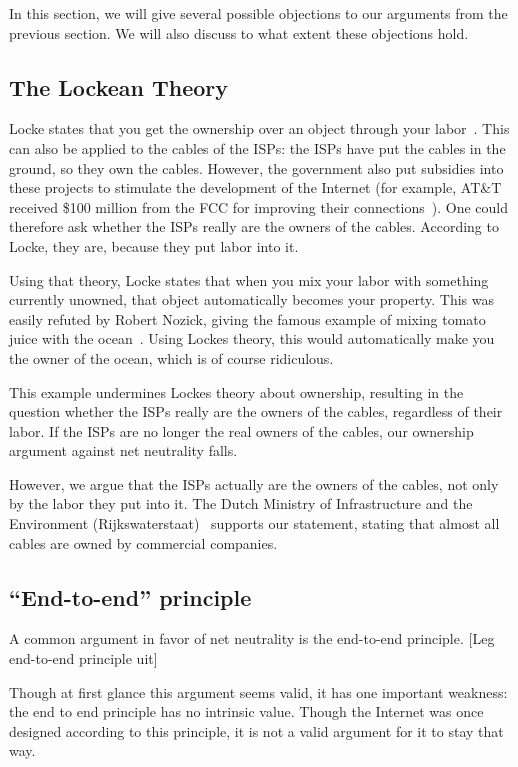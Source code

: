 
In this section, we will give several possible objections to our arguments from the previous section.
We will also discuss to what extent these objections hold.

\subsection{The Lockean Theory}
Locke states that you get the ownership over an object through your labor~\cite{tuckness2012locke}.
This can also be applied to the cables of the \acp{ISP}: the \acp{ISP} have put the cables in the ground, so they own the cables.
However, the government also put subsidies into these projects to stimulate the development of the Internet (for example, AT\&T received \$100 million from the FCC for improving their connections~\cite{bode2013att}).
One could therefore ask whether the \acp{ISP} really are the owners of the cables.
According to Locke, they are, because they put labor into it.

Using that theory, Locke states that when you mix your labor with something currently unowned, that object automatically becomes your property.
This was easily refuted by Robert Nozick, giving the famous example of mixing tomato juice with the ocean~\cite{tuckness2012locke}.
Using Lockes theory, this would automatically make you the owner of the ocean, which is of course ridiculous.

This example undermines Lockes theory about ownership, resulting in the question whether the \acp{ISP} really are the owners of the cables, regardless of their labor.
If the \acp{ISP} are no longer the real owners of the cables, our ownership argument against net neutrality falls.

However, we argue that the \acp{ISP} actually are the owners of the cables, not only by the labor they put into it.
The Dutch Ministry of Infrastructure and the Environment (Rijkswaterstaat)~\cite{rws2014kabels} supports our statement, stating that almost all cables are owned by commercial companies.

\subsection{``End-to-end'' principle}
A common argument in favor of net neutrality is the end-to-end principle. [Leg end-to-end principle uit] \cite{iskander2010end}

Though at first glance this argument seems valid, it has one important weakness: the end to end principle has no intrinsic value. Though the Internet was once designed according to this principle, it is not a valid argument for it to stay that way.

